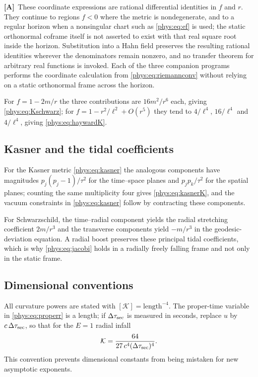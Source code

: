 \documentclass[11pt,letterpaper]{article}
\numberwithin{equation}{section}
\theoremstyle{definition}
\theoremstyle{remark}
\newcommand{\Kret}{\mathcal K}
\newcommand{\TA}{\textcolor{TierA}{\textsf{\bfseries[A]}}}
\begin{document}
\TA\ These coordinate expressions are rational differential identities in $f$
and $r$. They continue to regions $f<0$ where the metric is nondegenerate, and
to a regular horizon when a nonsingular chart such as \eqref{phys:eq:ef} is
used; the static orthonormal coframe itself is not asserted to exist with that
real square root inside the horizon. Substitution into a Hahn field preserves
the resulting rational identities wherever the denominators remain nonzero,
and no transfer theorem for arbitrary real functions is invoked. Each of the
three companion programs performs the coordinate calculation from
\eqref{phys:eq:riemannconv} without relying on a static orthonormal frame
across the horizon.

For $f=1-2m/r$ the three contributions are $16m^{2}/r^{6}$ each, giving
\eqref{phys:eq:Kschwarz}; for $f=1-r^{2}/\ell^{2}+O(r^{5})$ they tend to
$4/\ell^{4}$, $16/\ell^{4}$ and $4/\ell^{4}$, giving
\eqref{phys:eq:haywardK}.

\subsection{Kasner and the tidal coefficients}
\label{phys:app:sub:kasner}

For the Kasner metric \eqref{phys:eq:kasner} the analogous components have
magnitudes $p_{j}(p_{j}-1)/\tau^{2}$ for the time--space planes and
$p_{j}p_{k}/\tau^{2}$ for the spatial planes; counting the same multiplicity
four gives \eqref{phys:eq:kasnerK}, and the vacuum constraints in
\eqref{phys:eq:kasner} follow by contracting these components.

For Schwarzschild, the time--radial component yields the radial stretching
coefficient $2m/r^{3}$ and the transverse components yield $-m/r^{3}$ in the
geodesic-deviation equation. A radial boost preserves these principal tidal
coefficients, which is why \eqref{phys:eq:jacobi} holds in a radially freely
falling frame and not only in the static frame.

\subsection{Dimensional conventions}
\label{phys:app:sub:dimensions}

All curvature powers are stated with $[\Kret]=\text{length}^{-4}$. The
proper-time variable in \eqref{phys:eq:properr} is a length; if
$\Delta\tau_{\rm sec}$ is measured in seconds, replace $u$ by
$c\,\Delta\tau_{\rm sec}$, so that for the $E=1$ radial infall
\[
\Kret=\frac{64}{27\,c^{4}(\Delta\tau_{\rm sec})^{4}} .
\]
This convention prevents dimensional constants from being mistaken for new
asymptotic exponents.
\end{document}
